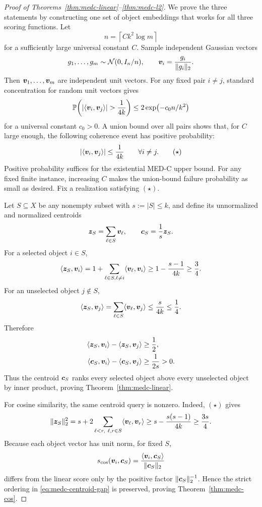 \documentclass{article}
\begin{document}
\begin{proof}[Proof of Theorems~\ref{thm:medc-linear}--\ref{thm:medc-l2}]
We prove the three statements by constructing one set of object embeddings that works for all three scoring functions. Let
\[
    n = \left\lceil C k^2\log m\right\rceil
\]
for a sufficiently large universal constant $C$. Sample independent Gaussian vectors
\[
    g_1,\dots,g_m\sim \mathcal{N}(0,I_n/n),
    \qquad
    \bm{v}_i=\frac{g_i}{\|g_i\|_2}.
\]
Then $\bm{v}_1,\dots,\bm{v}_m$ are independent unit vectors. For any fixed pair $i\ne j$, standard concentration for random unit vectors gives
\[
    \mathbb{P}\!\left(
    |\langle \vv_i,\vv_j\rangle|>\frac{1}{4k}
    \right)
    \leq
    2\exp\!\left(-c_0 n/k^2\right)
\]
for a universal constant $c_0>0$. A union bound over all pairs shows that, for $C$ large enough, the following coherence event has positive probability:
\[
    |\langle \bm{v}_i,\bm{v}_j\rangle|
    \leq
    \frac{1}{4k}
    \qquad \forall i\ne j.
    \tag{$\star$}
\]
Positive probability suffices for the existential MED-C upper bound. For any fixed finite instance, increasing $C$ makes the union-bound failure probability as small as desired.
Fix a realization satisfying $(\star)$.

Let $S\subseteq X$ be any nonempty subset with $s:=|S|\leq k$, and define its unnormalized and normalized centroids
\[
    \bm{z}_S=\sum_{\ell\in S}\bm{v}_\ell,
    \qquad
    \bm{c}_S=\frac{1}{s}\bm{z}_S .
\]
For a selected object $i\in S$,
\[
    \langle \bm{z}_S,\bm{v}_i\rangle
    =
    1+\sum_{\ell\in S,\ell\ne i}\langle \bm{v}_\ell,\bm{v}_i\rangle
    \geq
    1-\frac{s-1}{4k}
    \geq
    \frac{3}{4}.
\]
For an unselected object $j\notin S$,
\[
    \langle \bm{z}_S,\bm{v}_j\rangle
    =
    \sum_{\ell\in S}\langle \bm{v}_\ell,\bm{v}_j\rangle
    \leq
    \frac{s}{4k}
    \leq
    \frac{1}{4}.
\]
Therefore
\begin{align}
    \langle \bm{z}_S,\bm{v}_i\rangle
    -
    \langle \bm{z}_S,\bm{v}_j\rangle
    &\geq
    \frac{1}{2}, \notag\\
    \langle \bm{c}_S,\bm{v}_i\rangle
    -
    \langle \bm{c}_S,\bm{v}_j\rangle
    &\geq
    \frac{1}{2s}>0.
    \label{eq:medc-centroid-gap}
\end{align}
Thus the centroid $\bm{c}_S$ ranks every selected object above every unselected object by inner product, proving Theorem~\ref{thm:medc-linear}.

For cosine similarity, the same centroid query is nonzero. Indeed, $(\star)$ gives
\[
    \|\bm{z}_S\|_2^2
    =
    s+2\sum_{\ell<r,\ \ell,r\in S}\langle \bm{v}_\ell,\bm{v}_r\rangle
    \geq
    s-\frac{s(s-1)}{4k}
    \geq
    \frac{3s}{4}.
\]
Because each object vector has unit norm, for fixed $S$,
\[
    s_{\cos}(\bm{v}_i,\bm{c}_S)
    =
    \frac{\langle \bm{v}_i,\bm{c}_S\rangle}{\|\bm{c}_S\|_2}
\]
differs from the linear score only by the positive factor $\|\bm{c}_S\|_2^{-1}$. Hence the strict ordering in \eqref{eq:medc-centroid-gap} is preserved, proving Theorem~\ref{thm:medc-cos}.


\end{proof}
\end{document}
